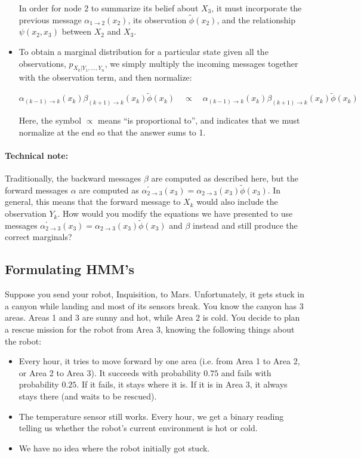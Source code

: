 \documentclass[6008notes.tex]{subfiles}
\begin{document}
\begin{itemize}
In order for node 2 to summarize its belief about $X_3$, it must incorporate the previous message $\alpha _{1 \to 2}(x_2)$, its observation $\tilde{\phi }(x_2)$, and the relationship $\psi (x_2,x_3)$ between $X_2$ and $X_3$.

\item To obtain a marginal distribution for a particular state given all the observations, $p_{X_ k|Y_1,\ldots ,Y_ n}$, we simply multiply the incoming messages together with the observation term, and then normalize:

{\centering$\alpha _{(k-1)\to k}(x_{k})\beta _{(k+1)\to k}(x_{k}) \tilde{\phi }(x_ k) \quad \propto \quad \alpha _{(k-1)\to k}(x_{k})\beta _{(k+1)\to k}(x_{k}) \tilde{\phi }(x_ k)$ \par}
	 	 
Here, the symbol $\propto$ means ``is proportional to'', and indicates that we must normalize at the end so that the answer sums to 1.
\end{itemize}

\paragraph{Technical note:} Traditionally, the backward messages $\beta$ are computed as described here, but the forward messages $\alpha$ are computed as $\alpha ^\prime _{2 \to 3}(x_3) = \alpha _{2 \to 3}(x_3) \tilde{\phi }(x_3)$. In general, this means that the forward message to $X_k$ would also include the observation $Y_k$. How would you modify the equations we have presented to use messages $\alpha ^\prime _{2 \to 3}(x_3) = \alpha _{2 \to 3}(x_3) \tilde{\phi }(x_3)$ and $\beta$ instead and still produce the correct marginals?


\subsection{Formulating HMM's}

Suppose you send your robot, Inquisition, to Mars. Unfortunately, it gets stuck in a canyon while landing and most of its sensors break. You know the canyon has 3 areas. Areas 1 and 3 are sunny and hot, while Area 2 is cold. You decide to plan a rescue mission for the robot from Area 3, knowing the following things about the robot:

\begin{itemize}
\item Every hour, it tries to move forward by one area (i.e. from Area 1 to Area 2, or Area 2 to Area 3). It succeeds with probability $0.75$ and fails with probability $0.25$. If it fails, it stays where it is. If it is in Area 3, it always stays there (and waits to be rescued).

\item The temperature sensor still works. Every hour, we get a binary reading telling us whether the robot's current environment is hot or cold.

\item We have no idea where the robot initially got stuck.
\end{itemize}
\end{document}

